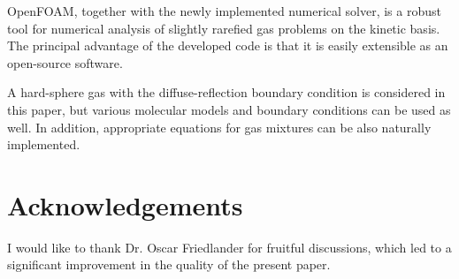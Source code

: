 \documentclass[smallextended, referee]{svjour3} %
\begin{document}
OpenFOAM\textregistered{}, together with the newly implemented numerical solver,
is a robust tool for numerical analysis of slightly rarefied gas problems
on the kinetic basis. The principal advantage of the developed code is that
it is easily extensible as an open-source software.

A hard-sphere gas with the diffuse-reflection boundary condition is considered in this paper,
but various molecular models and boundary conditions can be used as well.
In addition, appropriate equations for gas mixtures can be also naturally implemented.

\section{Acknowledgements}
I would like to thank Dr. Oscar Friedlander for fruitful discussions,
which led to a significant improvement in the quality of the present paper.


\end{document}
